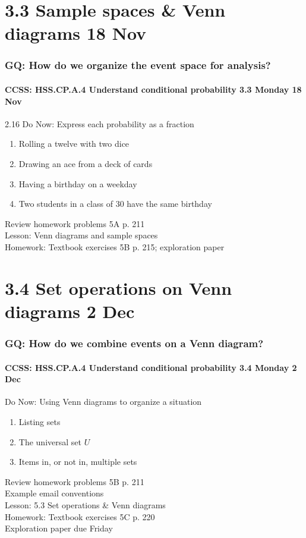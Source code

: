 \documentclass{beamer}
\begin{document}
\section{3.3 Sample spaces \& Venn diagrams 18 Nov}
\frame
{
  \frametitle{GQ: How do we organize the event space for analysis?}
  \framesubtitle{CCSS: HSS.CP.A.4 Understand conditional probability \hfill \alert{3.3 Monday 18 Nov}}

  \begin{block}{2.16 Do Now: Express each probability as a fraction}
  \begin{enumerate}
    \item Rolling a twelve with two dice
    \item Drawing an ace from a deck of cards
    \item Having a birthday on a weekday
    \item Two students in a class of 30 have the same birthday
  \end{enumerate}
  \end{block}
  Review homework problems 5A p. 211 \\
  Lesson: Venn diagrams and sample spaces \\ \smallskip
  Homework: Textbook exercises 5B p. 215; exploration paper
}

\section{3.4 Set operations on Venn diagrams 2 Dec}
\frame
{
  \frametitle{GQ: How do we combine events on a Venn diagram?}
  \framesubtitle{CCSS: HSS.CP.A.4 Understand conditional probability \hfill \alert{3.4 Monday 2 Dec}}

  \begin{block}{Do Now: Using Venn diagrams to organize a situation}
  \begin{enumerate}
    \item Listing sets
    \item The universal set $U$
    \item Items in, or not in, multiple sets
  \end{enumerate}
  \end{block}
  Review homework problems 5B p. 211 \\
  Example email conventions \\
  Lesson: 5.3 Set operations \& Venn diagrams \\ \smallskip
  Homework: Textbook exercises 5C p. 220 \\
  Exploration paper \alert{due Friday}
}
\end{document}

